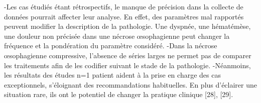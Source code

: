 \documentclass[./discussion]{subfiles}
\begin{document}
-Les cas étudiés étant rétrospectifs, le manque de précision dans la collecte de données pourrait affecter leur analyse. En effet, des paramètres mal rapportés peuvent modifier la description de la pathologie. Une dyspnée, une hématémèse, une douleur non précisée dans une nécrose œsophagienne peut changer la fréquence et la pondération du paramètre considéré.
-Dans la nécrose œsophagienne compressive, l’absence de séries larges ne permet pas de comparer les traitements afin de les codifier suivant le stade de la pathologie.
-Néanmoins, les résultats des études n=1 patient aident à la prise en charge des cas exceptionnels, s’éloignant des recommandations habituelles. En plus d’éclairer une situation rare, ils ont le potentiel de changer la pratique clinique [28], [29].
\end{document}
